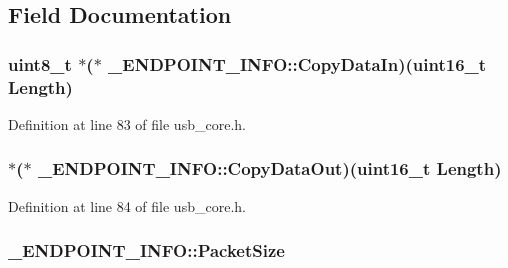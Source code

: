 \subsection{Field Documentation}
\hypertarget{struct___e_n_d_p_o_i_n_t___i_n_f_o_a14f4aec7173a623153f7b5ca9f5861ed}{
\subsubsection[{Copy\-Data\-In}]{ {\bf uint8\-\_\-t} $\ast$($\ast$ \-\_\-\-E\-N\-D\-P\-O\-I\-N\-T\-\_\-\-I\-N\-F\-O\-::\-Copy\-Data\-In)({\bf uint16\-\_\-t} Length)}}\label{struct___e_n_d_p_o_i_n_t___i_n_f_o_a14f4aec7173a623153f7b5ca9f5861ed}


Definition at line 83 of file usb\-\_\-core.\-h.

\hypertarget{struct___e_n_d_p_o_i_n_t___i_n_f_o_a5172b5ab39fd9bb6dce3fe0c1dd86deb}{
\subsubsection[{Copy\-Data\-Out}]{ $\ast$($\ast$ \-\_\-\-E\-N\-D\-P\-O\-I\-N\-T\-\_\-\-I\-N\-F\-O\-::\-Copy\-Data\-Out)({\bf uint16\-\_\-t} Length)}}\label{struct___e_n_d_p_o_i_n_t___i_n_f_o_a5172b5ab39fd9bb6dce3fe0c1dd86deb}


Definition at line 84 of file usb\-\_\-core.\-h.

\hypertarget{struct___e_n_d_p_o_i_n_t___i_n_f_o_ab57c7650cc9f9043544e43aa168cf6fc}{
\subsubsection[{Packet\-Size}]{ \-\_\-\-E\-N\-D\-P\-O\-I\-N\-T\-\_\-\-I\-N\-F\-O\-::\-Packet\-Size}}\label{struct___e_n_d_p_o_i_n_t___i_n_f_o_ab57c7650cc9f9043544e43aa168cf6fc}


